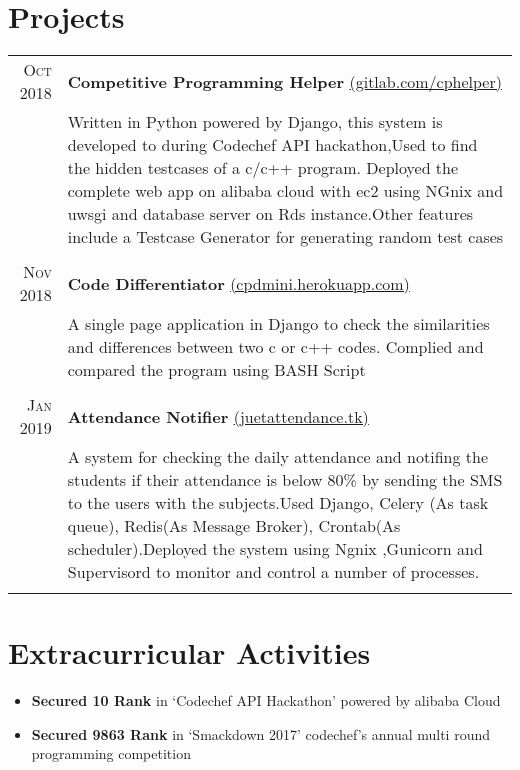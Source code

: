 \documentclass[a4paper,1pt]{article}
\begin{document}
\section{Projects}
\begin{tabular}{r|p{11cm}}

\textsc{Oct 2018} & \textbf{Competitive Programming Helper} 
\href{https://gitlab.com/gautamaggrawal/cphackathon}{(gitlab.com/cphelper)}\\&\footnotesize{Written in Python powered by Django, this system is developed to during Codechef API
hackathon,Used to find the hidden testcases of a c/c++ program. Deployed the complete web app on alibaba
cloud with ec2 using NGnix and uwsgi and database server on Rds instance.Other
features include a Testcase Generator for generating random test cases }\\\multicolumn{2}{c}{}\\

\textsc{Nov 2018} & \textbf{Code Differentiator} \href{http://cpdmini.herokuapp.com/}{(cpdmini.herokuapp.com)}\\&\footnotesize{A single page application in Django to check the similarities and differences between two
c or c++ codes. Complied and compared the program using BASH Script}\\\multicolumn{2}{c}{} \\
 \textsc{Jan 2019} & \textbf{Attendance Notifier} \href{http://18.191.156.30:8000/api/v1/}{(juetattendance.tk)}\\&\footnotesize{A system for checking the daily attendance and notifing the students if their attendance
is below 80\% by sending the SMS to the users with the subjects.Used Django, Celery (As task queue), Redis(As Message Broker), Crontab(As scheduler).Deployed the system using Ngnix ,Gunicorn and Supervisord to monitor and control a number of processes.}\\\multicolumn{2}{c}{} 

\end{tabular}

\section{Extracurricular Activities}{\raggedbottom}
\begin{itemize}
\item \textbf{Secured 10 Rank} in ‘Codechef API Hackathon' powered by alibaba Cloud
\item \textbf{Secured 9863 Rank} in ‘Smackdown 2017' codechef's annual multi round programming competition
\end{itemize}
\end{document}
